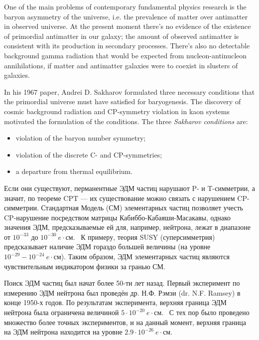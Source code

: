 
{\actuality} 

One of the main problems of contemporary fundamental physics research is the baryon asymmetry of the universe,
i.e. the prevalence of matter over antimatter in observed universe. At the present moment there's no evidence of the existence of primordial antimatter in our galaxy; the amount of observed antimatter is consistent with its production in secondary processes. There's also no detectable background gamma radiation that would be expected from nucleon-antinucleon annihilations, if matter and antimatter galaxies were to coexist in slusters of galaxies.~\cite{Trodden:Baryogenesis} 

In his 1967 paper, Andrei D. Sakharov formulated three necessary conditions that the primordial universe must have satisfied for baryogenesis. The discovery of cosmic background radiation and CP-symmetry violation in kaon systems~\cite{Fitch:Kaon-CP-violation-1964} motivated the formulation of the conditions. The three \emph{Sakharov conditions} are:
\begin{itemize}
	\item violation of the baryon number symmetry;
	\item violation of the discrete C- and CP-symmetries;
	\item a departure from thermal equilibrium.
\end{itemize}

Если они существуют, перманентные ЭДМ частиц нарушают P- и T-симметрии, а значит, по теореме CPT --- их существование можно связать с нарушением CP-симметрии. Стандартная Модель (СМ) элементарных частиц позволяет учесть CP-нарушение посредством матрицы Кабиббо-Кабаяши-Масакавы, однако значения ЭДМ, предсказываемые ей для, например, нейтрона, лежат в диапазоне от $10^{-33}$ до $10^{-30}~e\cdot$см.~\cite{Harris:Neutron2007} К примеру, теория SUSY (суперсимметрия) предсказывает наличие ЭДМ гораздо большей величины (на уровне $10^{-29} - 10^{-24}~e\cdot$см). Таким образом, ЭДМ элементарных частиц являются чувствительным индикатором физики за гранью СМ. 

Поиск ЭДМ частиц был начат более 50-ти лет назад. Первый эксперимент по измерению ЭДМ нейтрона был проведён др. Н.Ф. Рэмзи (dr. N.F. Ramsey) в конце 1950-х годов. По результатам эксперимента, верхняя граница ЭДМ нейтрона была ограничена величиной $5\cdot 10^{-20}~e\cdot$см.~\cite{Ramsey:Neutron1957} С тех пор было проведено множество более точных экспериментов, и на данный момент, верхняя граница на ЭДМ нейтрона находится на уровне $2.9\cdot 10^{-26}~e\cdot$см.~\cite{Baker:nEDM:Main, Baker:nEDM:Reply}

